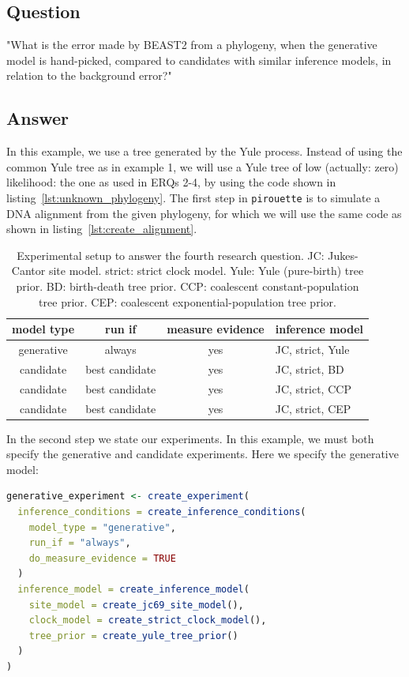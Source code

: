 \documentclass{article}
\begin{document}
\subsection{Question}

"What is the error made by BEAST2 from a phylogeny, 
when the generative model is hand-picked, 
compared to candidates with similar inference models, 
in relation to the background error?"

\subsection{Answer}

In this example, we use a tree generated by the Yule process.
Instead of using the common Yule tree as in example 1, we will use
a Yule tree of low (actually: zero) likelihood: 
the one as used in ERQs 2-4, by using the code shown 
in listing~\ref{lst:unknown_phylogeny}.
The first step in \verb;pirouette; is to simulate a DNA alignment 
from the given phylogeny, for which we will use the same code 
as shown in listing~\ref{lst:create_alignment}.

\begin{table}
  \begin{tabular}{ | c | c | c | l | }
    \hline
    \textbf{model type} & \textbf{run if} & \textbf{measure evidence} & 
\textbf{inference model} \\ 
    \hline
    generative & always         & yes & JC, strict, Yule \\
    candidate  & best candidate & yes & JC, strict, BD \\
    candidate  & best candidate & yes & JC, strict, CCP \\
    candidate  & best candidate & yes & JC, strict, CEP \\
    \hline
  \end{tabular}
  \caption{
    Experimental setup to answer the fourth research question.
    JC: Jukes-Cantor site model.
    strict: strict clock model.
    Yule: Yule (pure-birth) tree prior.
    BD: birth-death tree prior.
    CCP: coalescent constant-population tree prior.
    CEP: coalescent exponential-population tree prior.
  }
  \label{tab:experiment_5}
\end{table}

In the second step we state our experiments. 
In this example, we must both specify the generative and candidate experiments. 
Here we specify the generative model:

\begin{lstlisting}[language=R, floatplacement=H, frame=single]
generative_experiment <- create_experiment(
  inference_conditions = create_inference_conditions(
    model_type = "generative",
    run_if = "always",
    do_measure_evidence = TRUE
  )
  inference_model = create_inference_model(
    site_model = create_jc69_site_model(),
    clock_model = create_strict_clock_model(),
    tree_prior = create_yule_tree_prior()
  )
)
\end{lstlisting}
\end{document}
